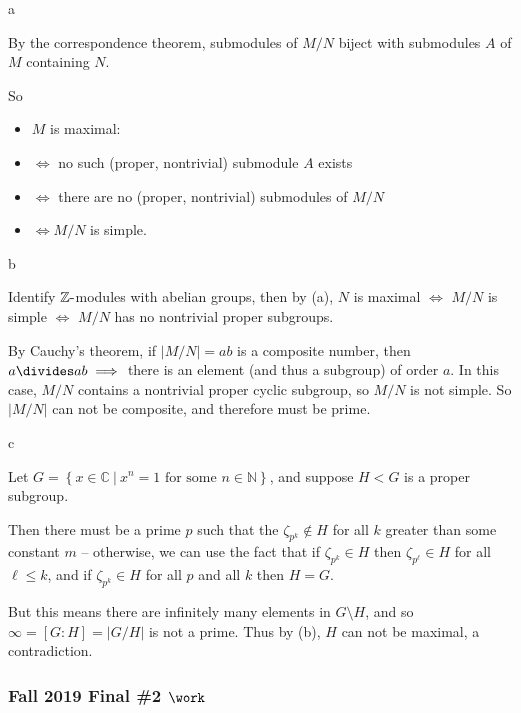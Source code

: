 \begin{solution}

a

By the correspondence theorem, submodules of \(M/N\) biject with
submodules \(A\) of \(M\) containing \(N\).

So

\begin{itemize}
\item
  \(M\) is maximal:
\item
  \(\iff\) no such (proper, nontrivial) submodule \(A\) exists
\item
  \(\iff\) there are no (proper, nontrivial) submodules of \(M/N\)
\item
  \(\iff M/N\) is simple.
\end{itemize}

b

Identify \({\mathbb{Z}}{\hbox{-}}\)modules with abelian groups, then by
(a), \(N\) is maximal \(\iff\) \(M/N\) is simple \(\iff\) \(M/N\) has no
nontrivial proper subgroups.

By Cauchy's theorem, if \({\left\lvert {M/N} \right\rvert} = ab\) is a
composite number, then \(a\divides ab \implies\) there is an element
(and thus a subgroup) of order \(a\). In this case, \(M/N\) contains a
nontrivial proper cyclic subgroup, so \(M/N\) is not simple. So
\({\left\lvert {M/N} \right\rvert}\) can not be composite, and therefore
must be prime.

c

Let
\(G = \left\{{x \in {\mathbb{C}}{~\mathrel{\Big|}~}x^n=1 \text{ for some }n\in {\mathbb{N}}}\right\}\),
and suppose \(H < G\) is a proper subgroup.

Then there must be a prime \(p\) such that the
\(\zeta_{p^k} \not \in H\) for all \(k\) greater than some constant
\(m\) -- otherwise, we can use the fact that if \(\zeta_{p^k} \in H\)
then \(\zeta_{p^\ell} \in H\) for all \(\ell \leq k\), and if
\(\zeta_{p^k} \in H\) for all \(p\) and all \(k\) then \(H = G\).

But this means there are infinitely many elements in \(G\setminus H\),
and so \(\infty = [G: H] = {\left\lvert {G/H} \right\rvert}\) is not a
prime. Thus by (b), \(H\) can not be maximal, a contradiction.

\end{solution}

\hypertarget{fall-2019-final-2-work}{%
\subsubsection{\texorpdfstring{Fall 2019 Final \#2
\(\work\)}{Fall 2019 Final \#2 \textbackslash work}}\label{fall-2019-final-2-work}}

